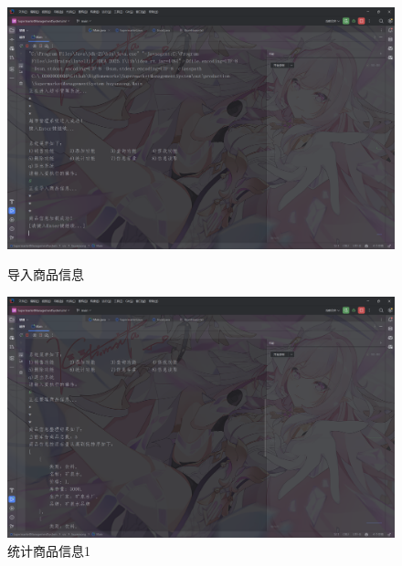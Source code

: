 \documentclass[12pt, a4paper, oneside]{ctexart}
\begin{document}
\begin{figure}[H]
    \begin{minipage}[t]{0.48\textwidth}
        \includegraphics[width=\textwidth]{images/导入商品信息.png}
        \caption*{导入商品信息}
    \end{minipage}
    \hfill
    \begin{minipage}[t]{0.48\textwidth}
        \includegraphics[width=\textwidth]{images/统计商品信息1.png}
        \caption*{统计商品信息1}
    \end{minipage}
\end{figure}
\end{document}
